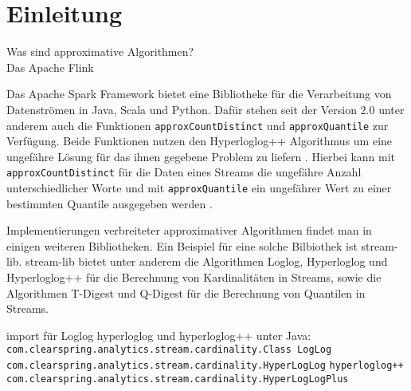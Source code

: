 \section{Einleitung}
Was sind approximative Algorithmen?\\




Das Apache Flink \cite{quoc2019}

Das Apache Spark Framework bietet eine Bibliotheke für die Verarbeitung von Datenströmen in Java, Scala und Python. 
Dafür stehen seit der Version 2.0 unter anderem auch die Funktionen \texttt{approxCountDistinct} und \texttt{approxQuantile} zur Verfügung. 
Beide Funktionen nutzen den Hyperloglog++ Algorithmus um eine ungefähre Lösung für das ihnen gegebene Problem zu liefern \cite{hunter2016}.
Hierbei kann mit \texttt{approxCountDistinct} für die Daten eines Streams die ungefähre Anzahl unterschiedlicher Worte 
und mit \texttt{approxQuantile} ein ungefährer Wert zu einer bestimmten Quantile ausgegeben werden \cite{hunter2016}. 

Implementierungen verbreiteter approximativer Algorithmen findet man in einigen weiteren Bibliotheken. 
Ein Beispiel für eine solche Bilbiothek ist stream-lib.
stream-lib bietet unter anderem die Algorithmen Loglog, 
Hyperloglog und Hyperloglog++ für die Berechnung von Kardinalitäten in Streams, 
sowie die Algorithmen T-Digest und Q-Digest für die Berechnung von Quantilen in Streams. 

import für Loglog hyperloglog und hyperloglog++ unter Java:
\texttt{com.clearspring.analytics.stream.cardinality.Class LogLog}
\texttt{com.clearspring.analytics.stream.cardinality.HyperLogLog}
\texttt{hyperloglog++ com.clearspring.analytics.stream.cardinality.HyperLogLogPlus}



